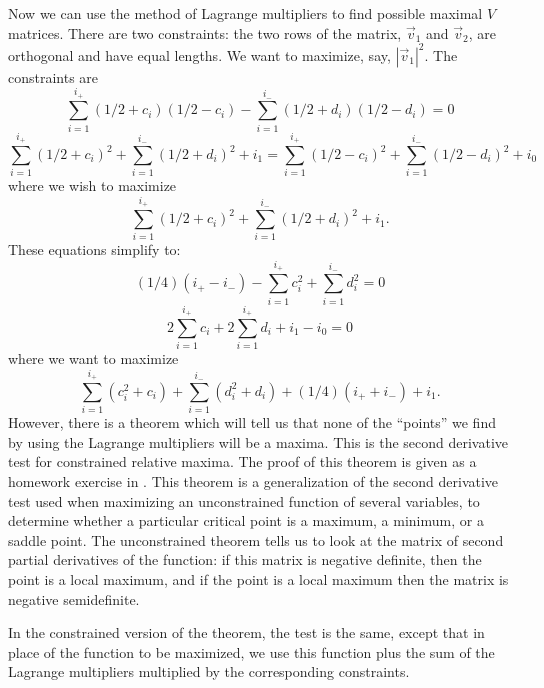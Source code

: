Now we can use the method of Lagrange multipliers to find possible maximal $V$
matrices.  There are two constraints:  the two rows of the matrix, $\vec{v}_1$
and $\vec{v}_2$, are orthogonal and have equal lengths.  We want to maximize,
say, $|\vec{v}_1|^2$.  The constraints are
\begin{equation*}
\sum_{i=1}^{i_+} (1/2 + c_i)(1/2 - c_i) -
\sum_{i=1}^{i_-} (1/2 + d_i)(1/2 - d_i) = 0
\end{equation*}
\begin{equation*}
\sum_{i=1}^{i_+} (1/2 + c_i)^2 +
\sum_{i=1}^{i_-} (1/2 + d_i)^2 + i_1 =
\sum_{i=1}^{i_+} (1/2 - c_i)^2 +
\sum_{i=1}^{i_-} (1/2 - d_i)^2 + i_0
\end{equation*}
where we wish to maximize
\begin{equation*}
\sum_{i=1}^{i_+} (1/2 + c_i)^2 + \sum_{i=1}^{i_-} (1/2 + d_i)^2 + i_1.
\end{equation*}
These equations simplify to:
\begin{equation*}
(1/4)(i_+ - i_-) - \sum_{i=1}^{i_+} c_i^2 + \sum_{i=1}^{i_-} d_i^2 = 0
\end{equation*}
\begin{equation*}
2 \sum_{i=1}^{i_+} c_i + 2 \sum_{i=1}^{i_+} d_i + i_1 - i_0 = 0
\end{equation*}
where we want to maximize
\begin{equation*}
\sum_{i=1}^{i_+} (c_i^2 + c_i) + \sum_{i=1}^{i_-} (d_i^2 + d_i) +
(1/4)(i_+ + i_-) + i_1.
\end{equation*}
However, there is a theorem which will tell us that none of the ``points'' we
find by using the Lagrange multipliers will be a maxima.  This is the second
derivative test for constrained relative maxima.  The proof of this theorem is
given as a homework exercise in \cite{fleming1965}.  This theorem is a
generalization of the second derivative test used when maximizing an
unconstrained function of several variables, to determine whether a particular
critical point is a maximum, a minimum, or a saddle point.  The unconstrained
theorem tells us to look at the matrix of second partial derivatives of the
function: if this matrix is negative definite, then the point is a local
maximum, and if the point is a local maximum then the matrix is negative
semidefinite.

In the constrained version of the theorem, the test is the same,
except that in place of the function to be maximized, we use this function
plus the sum of the Lagrange multipliers multiplied by the corresponding
constraints.

